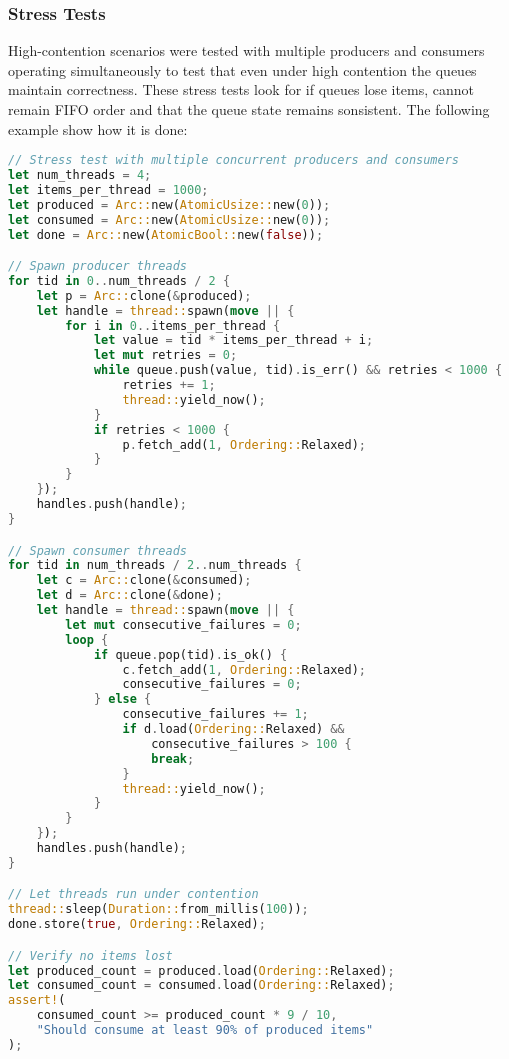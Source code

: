 \subsubsection{Stress Tests}
High-contention scenarios were tested with multiple producers and consumers operating simultaneously to test that even under high contention the queues maintain correctness. These stress tests look for if queues lose items, cannot remain \ac{FIFO} order and that the queue state remains sonsistent. The following example show how it is done:

\begin{lstlisting}[language=Rust, style=boxed, caption={High-contention stress test}, label={lst:stress-test}]
// Stress test with multiple concurrent producers and consumers
let num_threads = 4;
let items_per_thread = 1000;
let produced = Arc::new(AtomicUsize::new(0));
let consumed = Arc::new(AtomicUsize::new(0));
let done = Arc::new(AtomicBool::new(false));

// Spawn producer threads
for tid in 0..num_threads / 2 {
    let p = Arc::clone(&produced);
    let handle = thread::spawn(move || {
        for i in 0..items_per_thread {
            let value = tid * items_per_thread + i;
            let mut retries = 0;
            while queue.push(value, tid).is_err() && retries < 1000 {
                retries += 1;
                thread::yield_now();
            }
            if retries < 1000 {
                p.fetch_add(1, Ordering::Relaxed);
            }
        }
    });
    handles.push(handle);
}

// Spawn consumer threads
for tid in num_threads / 2..num_threads {
    let c = Arc::clone(&consumed);
    let d = Arc::clone(&done);
    let handle = thread::spawn(move || {
        let mut consecutive_failures = 0;
        loop {
            if queue.pop(tid).is_ok() {
                c.fetch_add(1, Ordering::Relaxed);
                consecutive_failures = 0;
            } else {
                consecutive_failures += 1;
                if d.load(Ordering::Relaxed) && 
                    consecutive_failures > 100 {
                    break;
                }
                thread::yield_now();
            }
        }
    });
    handles.push(handle);
}

// Let threads run under contention
thread::sleep(Duration::from_millis(100));
done.store(true, Ordering::Relaxed);

// Verify no items lost
let produced_count = produced.load(Ordering::Relaxed);
let consumed_count = consumed.load(Ordering::Relaxed);
assert!(
    consumed_count >= produced_count * 9 / 10,
    "Should consume at least 90% of produced items"
);
\end{lstlisting}

